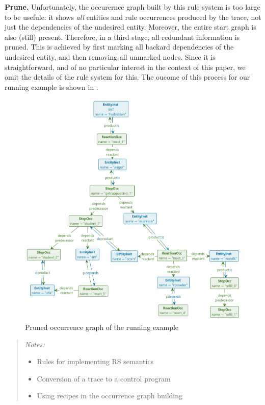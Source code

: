 \medskip\noindent\textbf{Prune.}
%
Unfortunately, the occurernce graph built by this rule system is too large to be usefule: it shows \emph{all} entities and rule occurrences produced by the trace, not just the dependencies of the undesired entity. Moreover, the entire start graph is also (still) present. Therefore, in a third stage, all redundant information is pruned. This is achieved by first marking all backard dependencies of the undesired entity, and then removing all unmarked nodes. Since it is straightforward, and of no particular interest in the context of this paper, we omit the details of the \GROOVE rule system for this. The oucome of this process for our running example is shown in .


\begin{figure}
\centering
\includegraphics[scale=.12]{figs/toy-pruned}
\caption{Pruned occurrence graph of the running example}
\label{fig:toy-pruned}
\end{figure}



\begin{quote}\it Notes:
\begin{itemize}
\item Rules for implementing RS semantics
\item Conversion of a trace to a control program
\item Using recipes in the occurrence graph building
\end{itemize}
\end{quote}